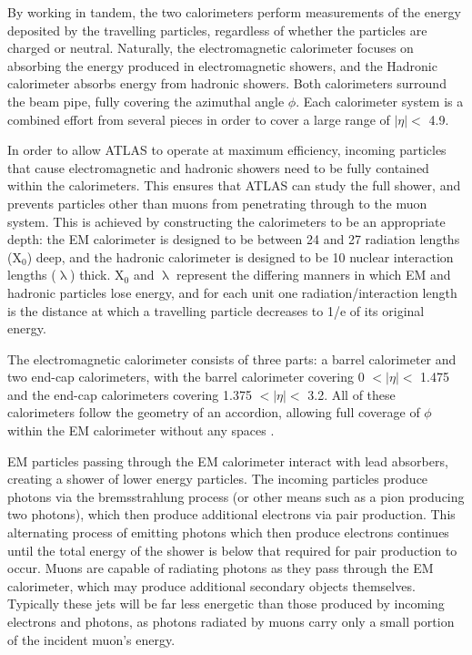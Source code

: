 \documentclass[12pt,a4paper,epsf,portrait,times,epsfig]{article}
\begin{document}
		By working in tandem, the two calorimeters perform measurements of the energy deposited by the travelling particles, regardless of whether the particles are charged or neutral. Naturally, the electromagnetic calorimeter focuses on absorbing the energy produced in electromagnetic showers, and the Hadronic calorimeter absorbs energy from hadronic
		showers. Both calorimeters surround the beam pipe, fully covering the azimuthal angle	$\phi$. Each calorimeter system is a combined effort from several pieces in order to cover a large range of $|\eta| <$ 4.9. \par
		
		In order to allow ATLAS to operate at maximum efficiency, incoming particles that cause electromagnetic and hadronic showers need to be fully contained within the calorimeters. This ensures that ATLAS can study the full shower, and prevents particles other than muons from penetrating through to the muon system. This is achieved by constructing the	calorimeters to be an appropriate depth: the EM calorimeter is designed to be between	24 and 27 radiation lengths (X$_{0}$) deep, and the hadronic calorimeter is designed to be 10 nuclear interaction lengths ($\uplambda$) thick. X$_{0}$ and $\uplambda$ represent the differing manners in which EM and hadronic particles lose energy, and for each unit one radiation/interaction length
		is the distance at which a travelling particle decreases to 1/e of its original energy.\par
		
		The electromagnetic calorimeter consists of three parts: a barrel calorimeter and two end-cap calorimeters, with the barrel calorimeter covering 0 $< |\eta| <$ 1.475 and the end-cap calorimeters covering 1.375 $< |\eta| <$ 3.2. All of these calorimeters follow the geometry of
		an accordion, allowing full coverage of $\phi$ within the EM calorimeter without any spaces 
		\cite{ATLAS-TDR-01, ATLAS-TDR-02, Article:ATLASDesignPaper}. \par 
		
		EM particles passing through the EM calorimeter interact with lead absorbers, creating a shower of lower energy particles. The incoming particles produce photons via the bremsstrahlung process (or other means such as a pion producing two photons), which then produce additional electrons via pair production. This alternating process of emitting
		photons which then produce electrons continues until the total energy of the shower is below that required for pair production to occur. Muons are capable of radiating photons as they pass through the EM calorimeter, which may produce additional secondary objects themselves. Typically these jets will be far less energetic than those produced by incoming electrons and photons,
		as photons radiated by muons carry only a small portion of the incident muon’s energy. \par
		
\end{document}

